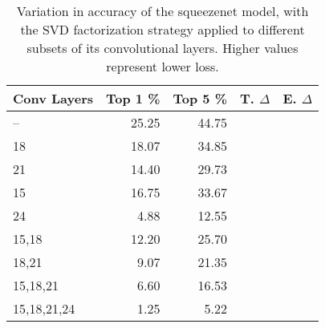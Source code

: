 \begin{table}
\centering
\begin{tabular}{|l|r|r|r|r|}
\hline
Conv Layers & Top 1 \% & Top 5 \% & T. $\Delta$ & E. $\Delta$ \\\hline
-- & 25.25 & 44.75 &  & \\\hline
18 & 18.07 & 34.85 &  &  \\\hline
21 & 14.40 & 29.73 &  &  \\\hline
15 & 16.75 & 33.67 &  &  \\\hline
24 & 4.88 & 12.55 &  &  \\\hline
15,18 & 12.20 & 25.70 &  &  \\\hline
18,21 & 9.07 & 21.35 &  &  \\\hline
15,18,21 & 6.60 & 16.53 &  &  \\\hline
15,18,21,24 & 1.25 & 5.22 &  &  \\\hline
\end{tabular}
\caption{Variation in accuracy of the squeezenet model, with the SVD factorization strategy applied to different subsets of its convolutional layers. Higher values represent lower loss.}
\label{squeezenet-accuracy}
\end{table}
